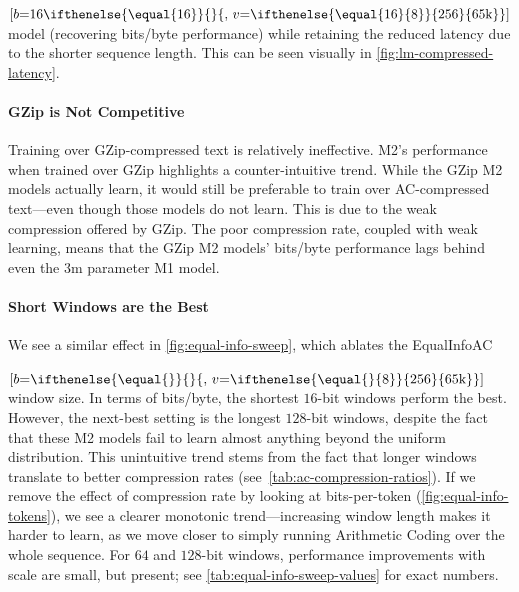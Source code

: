   {$[b\mathord{=}16\ifthenelse{\equal{16}}{}{,\,v\mathord{=}\ifthenelse{\equal{16}{8}}{256}{65\text{k}}}]$} model (recovering bits/byte performance) while retaining the reduced latency due to the shorter sequence length. This can be seen visually in \ref{fig:lm-compressed-latency}.

\paragraph{GZip is Not Competitive} Training over GZip-compressed text is relatively ineffective. M2's performance when trained over GZip highlights a counter-intuitive trend. While the GZip M2 models actually learn, it would still be preferable to train over AC-compressed text---even though those models do not learn. This is due to the weak compression offered by GZip. The poor compression rate, coupled with weak learning, means that the GZip M2 models' bits/byte performance lags behind even the $3$m parameter M1 model.

\paragraph{Short Windows are the Best} We see a similar effect in \ref{fig:equal-info-sweep}, which ablates the EqualInfoAC
\ifthenelse{
    \equal{} \AND \equal{}
  }

  {$[b\mathord{=}\ifthenelse{\equal{}}{}{,\,v\mathord{=}\ifthenelse{\equal{}{8}}{256}{65\text{k}}}]$} window size. In terms of bits/byte, the shortest $16$-bit windows perform the best. However, the next-best setting is the longest $128$-bit windows, despite the fact that these M2 models fail to learn almost anything beyond the uniform distribution. This unintuitive trend stems from the fact that longer windows translate to better compression rates (see~\ref{tab:ac-compression-ratios}). If we remove the effect of compression rate by looking at bits-per-token (\ref{fig:equal-info-tokens}), we see a clearer monotonic trend---increasing window length makes it harder to learn, as we move closer to simply running Arithmetic Coding over the whole sequence. For $64$ and $128$-bit windows, performance improvements with scale are small, but present; see \ref{tab:equal-info-sweep-values} for exact numbers.


